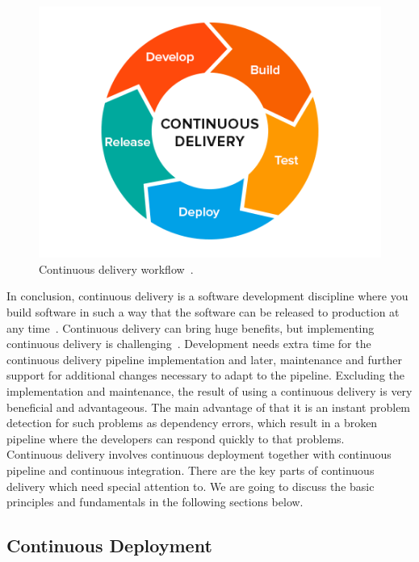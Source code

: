 \documentclass[12pt,a4paper]{article}
\theoremstyle{definition}
\begin{document}
    \begin{figure}[H]
        \centering
        \includegraphics[scale=0.5]{img/cd.png}
        \caption{Continuous delivery workflow~\cite{cd1}.}
        \label{fig:cd}
    \end{figure}

    In conclusion, continuous delivery is a software development discipline where you build software in such a way that the software can be released to production at any time~\cite{cd2}. Continuous delivery can bring huge benefits, but implementing continuous delivery is challenging~\cite{8452107}. Development needs extra time for the continuous delivery pipeline implementation and later, maintenance and further support for additional changes necessary to adapt to the pipeline. Excluding the implementation and maintenance, the result of using a continuous delivery is very beneficial and advantageous. The main advantage of that it is an instant problem detection for such problems as dependency errors, which result in a broken pipeline where the developers can respond quickly to that problems.\\

    Continuous delivery involves continuous deployment together with continuous pipeline and continuous integration. There are the key parts of continuous delivery which need special attention to. We are going to discuss the basic principles and fundamentals in the following sections below.

    \subsection{Continuous Deployment}
\end{document}
